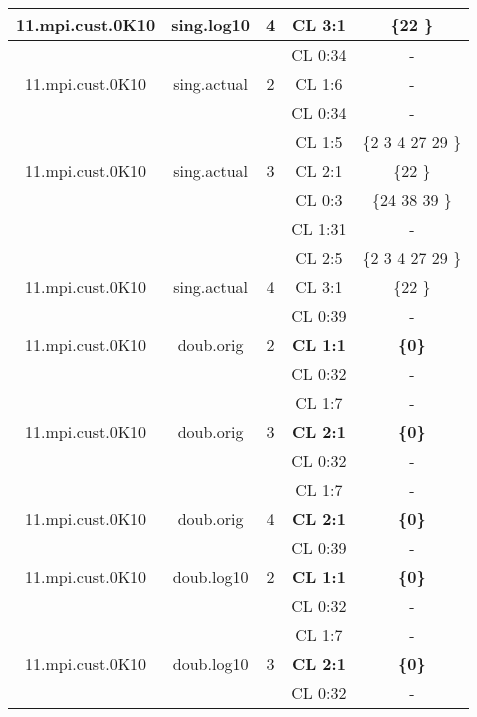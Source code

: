 \begin{table}[]
{\begin{tabular}{|c|c|c|c|c|}
\multirow{-4}{*}{11.mpi.cust.0K10} & \multirow{-4}{*}{sing.log10} & \multirow{-4}{*}{4} & CL 3:1 & \{22 \} \\ \hline
 &  &  & CL 0:34 & - \\ \cline{4-5}
\multirow{-2}{*}{11.mpi.cust.0K10} & \multirow{-2}{*}{sing.actual} & \multirow{-2}{*}{2} & CL 1:6 & - \\ \hline
 &  &  & CL 0:34 & - \\ \cline{4-5}
 &  &  & CL 1:5 & \{2 3 4 27 29 \} \\ \cline{4-5}
\multirow{-3}{*}{11.mpi.cust.0K10} & \multirow{-3}{*}{sing.actual} & \multirow{-3}{*}{3} & CL 2:1 & \{22 \} \\ \hline
 &  &  & CL 0:3 & \{24 38 39 \} \\ \cline{4-5}
 &  &  & CL 1:31 & - \\ \cline{4-5}
 &  &  & CL 2:5 & \{2 3 4 27 29 \} \\ \cline{4-5}
\multirow{-4}{*}{11.mpi.cust.0K10} & \multirow{-4}{*}{sing.actual} & \multirow{-4}{*}{4} & CL 3:1 & \{22 \} \\ \hline
 &  &  & CL 0:39 & - \\ \cline{4-5}
\multirow{-2}{*}{11.mpi.cust.0K10} & \multirow{-2}{*}{doub.orig} & \multirow{-2}{*}{2} & \textbf{CL 1:1} & \textbf{\{0\}} \\ \hline
 &  &  & CL 0:32 & - \\ \cline{4-5}
 &  &  & CL 1:7 & - \\ \cline{4-5}
\multirow{-3}{*}{11.mpi.cust.0K10} & \multirow{-3}{*}{doub.orig} & \multirow{-3}{*}{3} & \textbf{CL 2:1} & \textbf{\{0\}} \\ \hline
 &  &  & CL 0:32 & - \\ \cline{4-5}
 &  &  & CL 1:7 & - \\ \cline{4-5}
\multirow{-3}{*}{11.mpi.cust.0K10} & \multirow{-3}{*}{doub.orig} & \multirow{-3}{*}{4} & \textbf{CL 2:1} & \textbf{\{0\}} \\ \hline
 &  &  & CL 0:39 & - \\ \cline{4-5}
\multirow{-2}{*}{11.mpi.cust.0K10} & \multirow{-2}{*}{doub.log10} & \multirow{-2}{*}{2} & \textbf{CL 1:1} & \textbf{\{0\}} \\ \hline
 &  &  & CL 0:32 & - \\ \cline{4-5}
 &  &  & CL 1:7 & - \\ \cline{4-5}
\multirow{-3}{*}{11.mpi.cust.0K10} & \multirow{-3}{*}{doub.log10} & \multirow{-3}{*}{3} & \textbf{CL 2:1} & \textbf{\{0\}} \\ \hline
 &  &  & CL 0:32 & - \\ \cline{4-5}

\end{tabular}}
\end{table}
